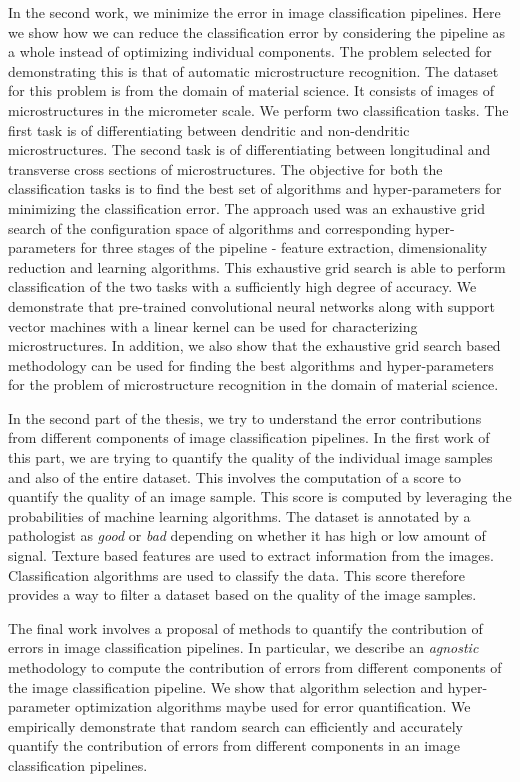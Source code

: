 In the second work, we minimize the error in image classification pipelines. Here we show how we can reduce the classification error by considering the pipeline as a whole instead of optimizing individual components. The problem selected for demonstrating this is that of automatic microstructure recognition. The dataset for this problem is from the domain of material science. It consists of images of microstructures in the micrometer scale. We perform two classification tasks. The first task is of differentiating between dendritic and non-dendritic microstructures. The second task is of differentiating between longitudinal and transverse cross sections of microstructures. The objective for both the classification tasks is to find the best set of algorithms and hyper-parameters for minimizing the classification error. The approach used was an exhaustive grid search of the configuration space of algorithms and corresponding hyper-parameters for three stages of the pipeline - feature extraction, dimensionality reduction and learning algorithms. This exhaustive grid search is able to perform classification of the two tasks with a sufficiently high degree of accuracy. We demonstrate that pre-trained convolutional neural networks along with support vector machines with a linear kernel can be used for characterizing microstructures. In addition, we also show that the exhaustive grid search based methodology can be used for finding the best algorithms and hyper-parameters for the problem of microstructure recognition in the domain of material science.

In the second part of the thesis, we try to understand the  error contributions from different components of  image classification pipelines. In the first work of this part, we are trying to quantify the quality of the individual image samples and also of the  entire dataset. This involves the computation of a score to quantify the quality of an image sample. This score is computed by leveraging the probabilities of machine learning algorithms. The dataset is annotated by a pathologist as \textit{good} or \textit{bad} depending on whether it has high or low amount of signal. Texture based features are used to extract information from the images. Classification algorithms are used to classify the data. This score therefore provides a way to filter a dataset based on the quality of the image samples.

The final work involves a proposal of methods to quantify the contribution of errors in image classification pipelines. In particular, we describe an \textit{agnostic} methodology to compute the contribution of errors from different components of the image classification pipeline.  We show that algorithm selection and hyper-parameter optimization algorithms maybe used for error quantification. We empirically demonstrate that random search can efficiently and accurately quantify the contribution of errors from different components  in an image classification pipelines.



